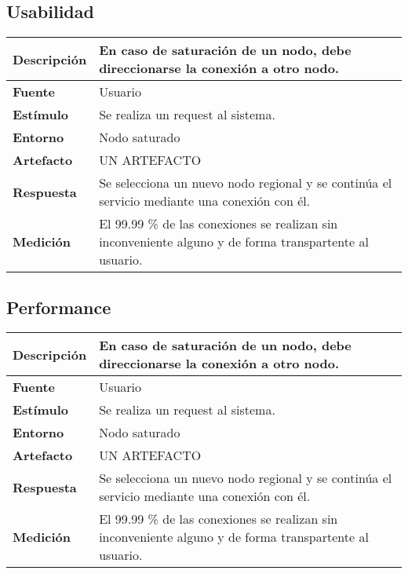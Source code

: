 \subsection{Usabilidad}

\begin{center}
  \begin{tabular}{| l | p{10cm} | }
    \hline
  \textbf{Descripción} & En caso de saturación de un nodo, debe direccionarse la conexión a otro nodo.\\  \hline
  \textbf{Fuente} & Usuario\\  \hline
  \textbf{Estímulo} & Se realiza un request al sistema.\\  \hline
  \textbf{Entorno} & Nodo saturado\\  \hline
  \textbf{Artefacto} & UN ARTEFACTO\\  \hline
  \textbf{Respuesta} & Se selecciona un nuevo nodo regional y se continúa el servicio mediante una conexión con él.\\  \hline
  \textbf{Medición} & El 99.99 \% de las conexiones se realizan sin inconveniente alguno y de forma transpartente al usuario.\\  \hline
  \end{tabular}
\end{center} 

\subsection{Performance}

\begin{center}
  \begin{tabular}{| l | p{10cm} | }
    \hline
  \textbf{Descripción} & En caso de saturación de un nodo, debe direccionarse la conexión a otro nodo.\\  \hline
  \textbf{Fuente} & Usuario\\  \hline
  \textbf{Estímulo} & Se realiza un request al sistema.\\  \hline
  \textbf{Entorno} & Nodo saturado\\  \hline
  \textbf{Artefacto} & UN ARTEFACTO\\  \hline
  \textbf{Respuesta} & Se selecciona un nuevo nodo regional y se continúa el servicio mediante una conexión con él.\\  \hline
  \textbf{Medición} & El 99.99 \% de las conexiones se realizan sin inconveniente alguno y de forma transpartente al usuario.\\  \hline
  \end{tabular}
\end{center} 

